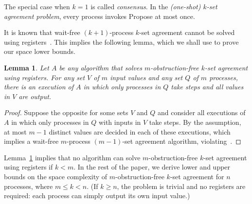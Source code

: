 \documentclass[11pt]{article}
\newtheorem{theorem}{Theorem}
\newtheorem{lemma}[theorem]{Lemma}
\newcommand{\ignore}[1]{}
\begin{document}
The special case when $k=1$ is called \emph{consensus}.
In the \emph{(one-shot) $k$-set agreement problem}, every process
invokes {\sc Propose} at most once.

\ignore{
\begin{theorem}\label{thm:kset-mof}
There is no algorithm solving $m$-obstruction-free 
$k$-set-agreement using registers if $k<m$.
\end{theorem}
\begin{proof}
The fact that $(k+1)$-process $k$-set agreement cannot
be solved~\cite{HS99,BG93b,SZ00} implies that
$(k+1)$-obstruction-free (and, thus, $k'$-obstruction-free for $k'\geq
k$) cannot be solved: it is sufficient to consider the set of
executions in which only the first $k+1$ processes are active.   


\end{proof}

It is then straightforward to derive that: }

It is known that wait-free $(k+1)$-process $k$-set agreement cannot
be solved using registers~\cite{BG93b,HS99,SZ00}.  This implies the following lemma,
which we shall use to prove our space lower bounds.

\begin{lemma}\label{lem:m-val}
Let $A$ be any algorithm that solves $m$-obstruction-free $k$-set
agreement using registers.  
For any set $V$ of $m$ input values and any set $Q$ of $m$ processes, there is an execution of $A$ in
which only processes in $Q$ take steps and all values in $V$ are output.
\end{lemma}
\begin{proof}
Suppose the opposite for some sets $V$ and $Q$  and consider all executions of $A$ in which only 
processes in $Q$ with inputs in $V$ take steps. By the assumption, at most $m-1$ distinct
values are decided in each of these executions, which implies a wait-free
$m$-process $(m-1)$-set agreement algorithm, violating~\cite{BG93b,HS99,SZ00}.   
\end{proof}

Lemma~\ref{lem:m-val} implies that no algorithm
can solve  $m$-obstruction-free $k$-set agreement using registers if $k<m$.  
In the rest of the paper, we derive lower and upper bounds on the
space complexity of $m$-obstruction-free $k$-set agreement for $n$ processes, where $m\leq k < n$.  
(If $k\geq n$, the problem is trivial and no registers are required: each process can simply output its own input value.)
\end{document}
